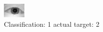 \begin{figure}[h!]
\begin{center}
\includegraphics[width=0.60\columnwidth]{figures/ID1013_class_1_target_2.png}
\end{center}
\caption{ Classification: 1 actual target: 2}
\label{fig:ID1013_class_1_target_2}
\end{figure}

